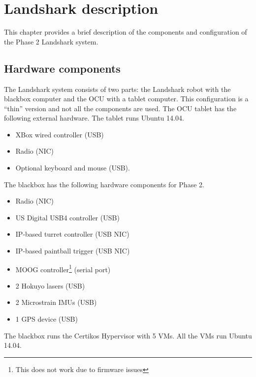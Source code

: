 \chapter{Landshark description}
This chapter provides a brief description of the components and configuration of the Phase 2
Landshark system.

\section{Hardware components}

The Landshark system consists of two parts: the Landshark robot with the blackbox computer and
the OCU with a tablet computer. This configuration is a ``thin'' version and not all the
components are used.
The OCU tablet has the following external hardware.  The tablet runs Ubuntu 14.04.
\begin{itemize}
  \item XBox wired controller (USB)
  \item Radio (NIC)
  \item Optional keyboard and mouse (USB).
\end{itemize}
The blackbox has the following hardware components for Phase 2.  
\begin{itemize}
  \item Radio (NIC)
  \item US Digital USB4 controller (USB)
  \item IP-based turret controller (USB NIC)
  \item IP-based paintball trigger (USB NIC)
  \item MOOG controller\footnote{This does not work due to firmware issues} (serial port) 
  \item 2 Hokuyo lasers (USB)
  \item 2 Microstrain IMUs (USB)
  \item 1 GPS device (USB)
\end{itemize}
The blackbox runs the Certikos Hypervisor with 5 VMs. All the VMs run Ubuntu 14.04.

